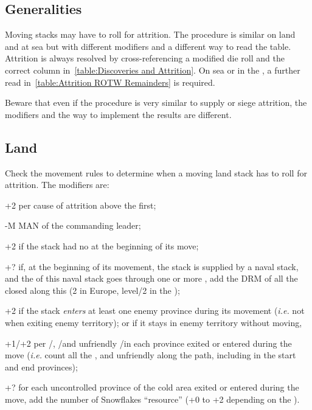 \subsection{Generalities}
Moving stacks may have to roll for attrition. The procedure is similar on land
and at sea but with different modifiers and a different way to read the
table. Attrition is always resolved by cross-referencing a modified die roll
and the correct column in~\ref{table:Discoveries and Attrition}. On sea or in
the \ROTW, a further read in~\ref{table:Attrition ROTW Remainders} is
required.

Beware that even if the procedure is very similar to supply or siege
attrition, the modifiers and the way to implement the results are different.

\subsection{Land}
Check the movement rules to determine when a moving land stack has to roll for
attrition. The modifiers are:
\begin{modlist}
\item[+2] per cause of attrition above the first;
\item[-M] MAN of the commanding leader;
\item[+2] if the stack had no \LoS at the beginning of its move;
\item[+?] if, at the beginning of its movement, the stack is supplied by a
  naval stack, and the \LoS of this naval stack goes through one or more
  \StraitFort, add the DRM of all the closed \StraitFort along this \LoS (2 in
  Europe, level/2 in the \ROTW);
\item[+2] if the stack \emph{enters} at least one enemy province during its
  movement (\emph{i.e.}  not when exiting enemy territory); or if it stays in
  enemy territory without moving,
\item[+1/+2] per \PILLAGE\Facemoins/\Faceplus, \REVOLT\Facemoins/\Faceplus and
  unfriendly \REBELLION\Facemoins/\Faceplus in each province exited or entered
  during the move (\emph{i.e.} count all the \PILLAGE, \REVOLT and unfriendly
  \REBELLION along the path, including in the start and end provinces);
\item[+?] for each uncontrolled province of the \ROTW cold area exited or
  entered during the move, add the number of Snowflakes ``resource'' (+0 to +2
  depending on the \Area).
\end{modlist}

